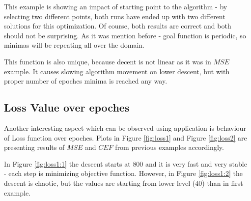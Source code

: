 \documentclass[11pt,a4paper]{IEEEtran}
\begin{document}
This example is showing an impact of starting point to the algorithm - by selecting two different points, both runs have ended up with two different solutions for this optimization. Of course, both results are correct and both should not be surprising. As it was mention before - goal function is periodic, so minimas will be repeating all over the domain. 

This function is also unique, because decent is not linear as it was in $MSE$ example. It causes slowing algorithm movement on lower descent, but with proper number of epoches minima is reached any way.

\subsection{Loss Value over epoches}

Another interesting aspect which can be observed using application is behaviour of Loss function over epoches. Plots in Figure \ref{fig:loss1} and Figure \ref{fig:loss2} are presenting results of $MSE$ and $CEF$ from previous examples accordingly.

In Figure \ref{fig:loss1:1} the descent starts at $800$ and it is very fast and very stable - each step is minimizing objective function. However, in Figure \ref{fig:loss1:2} the descent is chaotic, but the values are starting from lower level ($40$) than in first example.
\end{document}
